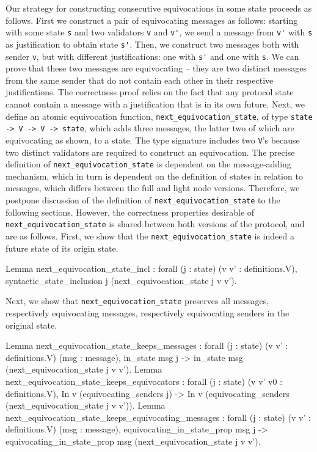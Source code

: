 \documentclass[runningheads]{llncs}
\begin{document}
Our strategy for constructing consecutive equivocations in some state proceeds as follows. First we construct a pair of equivocating messages as follows: starting with some state \verb|s| and two validators \verb|v| and \verb|v'|, we send a message from \verb|v'|  with \verb|s| as justification to obtain state \verb|s'|. Then, we construct two messages both with sender \verb|v|, but with different justifications: one with \verb|s'| and one  with \verb|s|. We can prove that these two messages are equivocating -- they are two distinct messages from the same sender that do not contain each other in their respective justifications. The correctness proof relies on the fact that any protocol state cannot contain a message with a justification that is in its own future. Next, we define an atomic equivocation function, \verb|next_equivocation_state|, of type \verb|state -> V -> V -> state|, which adds three messages, the latter two of which are equivocating as shown, to a state. The type signature includes two \verb|V|'s because two distinct validators are required to construct an equivocation. 
The precise definition of \verb|next_equivocation_state| is dependent on the message-adding mechanism, which in turn is dependent on the definition of states in relation to messages, which differs between the full and light node versions. Therefore, we postpone discussion of the definition of \verb|next_equivocation_state| to the following sections. However, the correctness properties desirable of \verb|next_equivocation_state| is shared between both versions of the protocol, and are as follows. 
First, we show that the \verb|next_equivocation_state| is indeed a future state of its origin state. 
\begin{coq} 
Lemma next_equivocation_state_incl :
	forall (j : state) (v v' : definitions.V),
	syntactic_state_inclusion j (next_equivocation_state j v v'). 
\end{coq}
Next, we show that \verb|next_equivocation_state|  preserves all messages, respectively equivocating messages, respectively equivocating senders in the original state. 
\begin{coq}
Lemma next_equivocation_state_keeps_messages :
	forall (j : state) (v v' : definitions.V) (msg : message),
	in_state msg j ->
	in_state msg (next_equivocation_state j v v'). 
Lemma next_equivocation_state_keeps_equivocators :
	forall (j : state) (v v' v0 : definitions.V),
	In v (equivocating_senders j) ->
	In v (equivocating_senders (next_equivocation_state j v v')). 
Lemma next_equivocation_state_keeps_equivocating_messages :
	forall (j : state) (v v' : definitions.V) (msg : message),
	equivocating_in_state_prop msg j ->
	equivocating_in_state_prop msg (next_equivocation_state j v v'). 
\end{coq}
\end{document}
